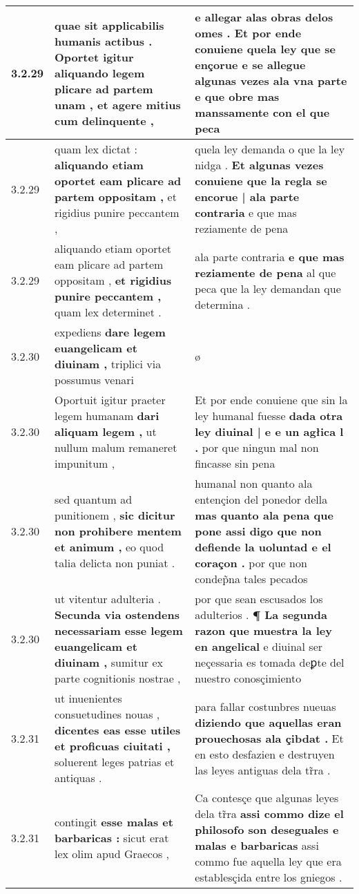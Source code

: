 \begin{tabular}{|p{1cm}|p{6.5cm}|p{6.5cm}|}
3.2.29 & quae sit applicabilis humanis actibus . \textbf{ Oportet igitur aliquando legem plicare ad partem unam , } et agere mitius cum delinquente , & e allegar alas obras delos omes . \textbf{ Et por ende conuiene quela ley que se ençorue } e se allegue algunas vezes ala vna parte e que obre mas manssamente con el que peca \\\hline
3.2.29 & quam lex dictat : \textbf{ aliquando etiam oportet eam plicare ad partem oppositam , } et rigidius punire peccantem , & quela ley demanda o que la ley nidga . \textbf{ Et algunas vezes conuiene que la regla se encorue | ala parte contraria } e que mas reziamente de pena \\\hline
3.2.29 & aliquando etiam oportet eam plicare ad partem oppositam , \textbf{ et rigidius punire peccantem , } quam lex determinet . & ala parte contraria \textbf{ e que mas reziamente de pena } al que peca que la ley demandan que determina . \\\hline
3.2.30 & expediens \textbf{ dare legem euangelicam et diuinam , } triplici via possumus venari & ø \\\hline
3.2.30 & Oportuit igitur praeter legem humanam \textbf{ dari aliquam legem , } ut nullum malum remaneret impunitum , & Et por ende conuiene que sin la ley humanal fuesse \textbf{ dada otra ley diuinal | e e un agłica l . } por que ningun mal non fincasse sin pena \\\hline
3.2.30 & sed quantum ad punitionem , \textbf{ sic dicitur non prohibere mentem et animum , } eo quod talia delicta non puniat . & humanal non quanto ala entençion del ponedor della \textbf{ mas quanto ala pena que pone assi digo que non defiende la uoluntad e el coraçon . } por que non condep̃na tales pecados \\\hline
3.2.30 & ut vitentur adulteria . \textbf{ Secunda via ostendens necessariam esse legem euangelicam et diuinam , } sumitur ex parte cognitionis nostrae , & por que sean escusados los adulterios . \textbf{ ¶ La segunda razon que muestra la ley en angelical } e diuinal ser neçessaria es tomada deꝑte del nuestro conosçimiento \\\hline
3.2.31 & ut inuenientes consuetudines nouas , \textbf{ dicentes eas esse utiles et proficuas ciuitati , } soluerent leges patrias et antiquas . & para fallar costunbres nueuas \textbf{ diziendo que aquellas eran prouechosas ala çibdat . } Et en esto desfazien e destruyen las leyes antiguas dela tr̃ra . \\\hline
3.2.31 & contingit \textbf{ esse malas et barbaricas : } sicut erat lex olim apud Graecos , & Ca contesçe que algunas leyes dela tr̃ra \textbf{ assi commo dize el philosofo son deseguales e malas e barbaricas } assi commo fue aquella ley que era establesçida entre los gniegos . \\\hline

\end{tabular}
